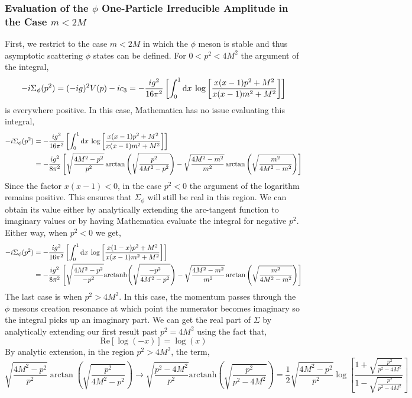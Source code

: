 \documentclass[12pt]{extarticle}
\begin{document}
\subsubsection{Evaluation of the $\phi$ One-Particle Irreducible Amplitude in the Case $m < 2 M$}

First, we restrict to the case $m < 2 M$ in which the $\phi$ meson is stable and thus asymptotic scattering $\phi$ states can be defined. For $0 < p^2 < 4 M^2$ the argument of the integral,
\[ - i \Sigma_\phi(p^2) = (-ig)^2 V(p) - i c_3 = - \frac{ig^2}{16 \pi^2} \left[ \int_{0}^{1} \mathrm{d}x \: \log{\left[\frac{x(x - 1) p^2 + M^2}{x(x - 1) m^2 + M^2} \right]} \right] \]
is everywhere positive. In this case, Mathematica has no issue evaluating this integral, 
\begin{align*}
- i \Sigma_\phi(p^2) &= - \frac{ig^2}{16 \pi^2} \left[ \int_{0}^{1} \mathrm{d}x \: \log{\left[\frac{x(x - 1) p^2 + M^2}{x(x - 1) m^2 + M^2} \right]} \right] 
\\
& = - \frac{ig^2}{8 \pi^2} \left[ \sqrt{\frac{4 M^2 - p^2}{p^2}} \arctan{\left( \sqrt{\frac{p^2}{4 M^2 - p^2}} \right)} - \sqrt{\frac{4 M^2 - m^2}{m^2}} \arctan{\left( \sqrt{\frac{m^2}{4 M^2 - m^2}}\right)}\right]
\end{align*}
Since the factor $x(x-1) < 0$, in the case $p^2 < 0$ the argument of the logarithm remains positive. This ensures that $\Sigma_\phi$ will still be real in this region. We can obtain its value either by analytically extending the arc-tangent function to imaginary values or by having Mathematica evaluate the integral for negative $p^2$. Either way, when $p^2 < 0$ we get,
\begin{align*}
- i \Sigma_\phi(p^2) &= - \frac{ig^2}{16 \pi^2} \left[ \int_{0}^{1} \mathrm{d}x \: \log{\left[\frac{x(1 - x) p^2 + M^2}{x(x - 1) m^2 + M^2} \right]} \right] 
\\
& = - \frac{ig^2}{8 \pi^2} \left[ \sqrt{\frac{4 M^2 - p^2}{-p^2}} \mathrm{arctanh}{\left(\sqrt{\frac{-p^2}{4 M^2 - p^2}}\right)} - \sqrt{\frac{4 M^2 - m^2}{m^2}} \arctan{\left(\sqrt{\frac{m^2}{4 M^2 - m^2}}\right)}\right]
\end{align*}
The last case is when $p^2 > 4 M^2$. In this case, the momentum passes through the $\phi$ mesons creation resonance at which point the numerator becomes imaginary so the integral picks up an imaginary part. We can get the real part of $\Sigma$ by analytically extending our first result past $p^2 = 4 M^2$ using the fact that,
\[ \mathrm{Re}[\log{(-x)}] = \log{(x)} \]
By analytic extension, in the region $p^2  > 4 M^2$, the term,
\[\sqrt{\frac{4 M^2 - p^2}{p^2}} \arctan{\left(\sqrt{\frac{p^2}{4 M^2 - p^2}}\right)} \to \sqrt{\frac{p^2 - 4 M^2}{p^2}} \mathrm{arctanh}{\left(\sqrt{\frac{p^2}{p^2 - 4 M^2}}\right)} = \frac{1}{2} \sqrt{\frac{4 M^2 - p^2}{p^2}} \log{\left[ \frac{1 + \sqrt{\frac{p^2}{p^2 - 4 M^2}}}{1 - \sqrt{\frac{p^2}{p^2 - 4 M^2}}} \right]}\]
\end{document}
